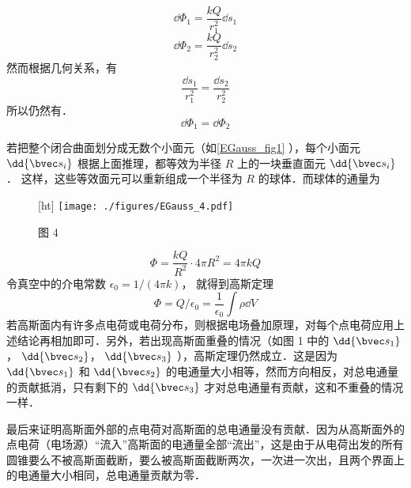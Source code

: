 \begin{equation}
\dd{\Phi_1} = \frac{kQ}{r_1^2} \dd{s_1}
\end{equation}
\begin{equation}
\dd{\Phi_2} = \frac{kQ}{r_2^2} \dd{s_2}
\end{equation}
然而根据几何关系，有
\begin{equation}
\frac{\dd{s_1}}{r_1^2} = \frac{\dd{s_2}}{r_2^2}
\end{equation} 
所以仍然有．
\begin{equation}
\dd{\Phi_1} = \dd{\Phi_2}
\end{equation} 

若把整个闭合曲面划分成无数个小面元（如\autoref{EGauss_fig1} ），每个小面元 $\dd{\bvec s_i}$ 根据上面推理，都等效为半径 $R$ 上的一块垂直面元 $\dd{\bvec s_i}$． 这样，这些等效面元可以重新组成一个半径为 $R$ 的球体．而球体的通量为
\begin{figure}\label{EGauss_fig1}[ht]
\centering
\texttt{[image: ./figures/EGauss\_4.pdf]}
\caption{图 4}
\end{figure}

\begin{equation}
\Phi  = \frac{kQ}{R^2} \cdot 4\pi R^2 = 4\pi kQ
\end{equation} 
令真空中的介电常数 $\epsilon_0 = 1/(4\pi k)$， 就得到高斯定理
\begin{equation}
\Phi  = Q/\epsilon_0 = \frac{1}{\epsilon_0} \int \rho \dd{V}
\end{equation} 
若高斯面内有许多点电荷或电荷分布，则根据电场叠加原理，对每个点电荷应用上述结论再相加即可．另外，若出现高斯面重叠的情况（如图 1 中的 $\dd{\bvec s_1}$，  $\dd{\bvec s_2}$，  $\dd{\bvec s_3}$ ），高斯定理仍然成立．这是因为 $\dd{\bvec s_1}$ 和 $\dd{\bvec s_2}$ 的电通量大小相等，然而方向相反，对总电通量的贡献抵消，只有剩下的 $\dd{\bvec s_3}$ 才对总电通量有贡献，这和不重叠的情况一样．

最后来证明高斯面外部的点电荷对高斯面的总电通量没有贡献．因为从高斯面外的点电荷（电场源）“流入”高斯面的电通量全部“流出”，这是由于从电荷出发的所有圆锥要么不被高斯面截断，要么被高斯面截断两次，一次进一次出，且两个界面上的电通量大小相同，总电通量贡献为零．
 